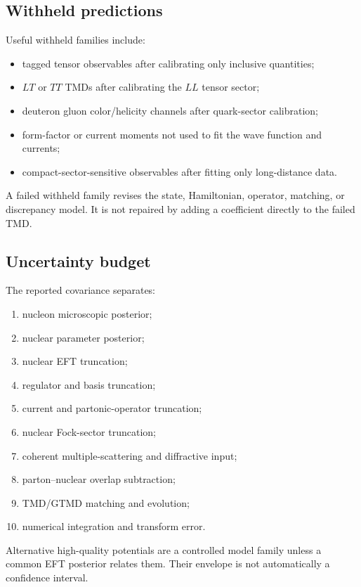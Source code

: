 \documentclass[11pt]{article}
\begin{document}
\subsection{Withheld predictions}

Useful withheld families include:
\begin{itemize}
\item tagged tensor observables after calibrating only inclusive quantities;
\item \(LT\) or \(TT\) TMDs after calibrating the \(LL\) tensor sector;
\item deuteron gluon color/helicity channels after quark-sector calibration;
\item form-factor or current moments not used to fit the wave function and
      currents;
\item compact-sector-sensitive observables after fitting only long-distance
      data.
\end{itemize}
A failed withheld family revises the state, Hamiltonian, operator, matching,
or discrepancy model.  It is not repaired by adding a coefficient directly
to the failed TMD.

\subsection{Uncertainty budget}

The reported covariance separates:
\begin{enumerate}
\item nucleon microscopic posterior;
\item nuclear parameter posterior;
\item nuclear EFT truncation;
\item regulator and basis truncation;
\item current and partonic-operator truncation;
\item nuclear Fock-sector truncation;
\item coherent multiple-scattering and diffractive input;
\item parton--nuclear overlap subtraction;
\item TMD/GTMD matching and evolution;
\item numerical integration and transform error.
\end{enumerate}
Alternative high-quality potentials are a controlled model family unless a
common EFT posterior relates them.  Their envelope is not automatically a
confidence interval.
\end{document}
